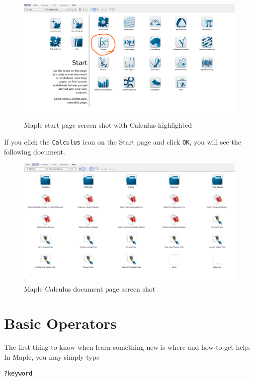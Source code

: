 \documentclass[]{book}
\theoremstyle{definition}
\theoremstyle{definition}
\theoremstyle{definition}
\theoremstyle{remark}
\begin{document}
\begin{figure}
\centering
\includegraphics{figs/Start-Page-Calculus.png}
\caption{Maple start page screen shot with Calculus highlighted}
\end{figure}

If you click the \texttt{Calculus} icon on the Start page and click \texttt{OK}, you will see the following document.

\begin{figure}
\centering
\includegraphics{figs/Calculus-Doc.png}
\caption{Maple Calculus document page screen shot}
\end{figure}

\hypertarget{basic-operators}{%
\section{Basic Operators}\label{basic-operators}}

The first thing to know when learn something new is where and how to get help. In Maple, you may simply type

\begin{verbatim}
?keyword
\end{verbatim}
\end{document}

